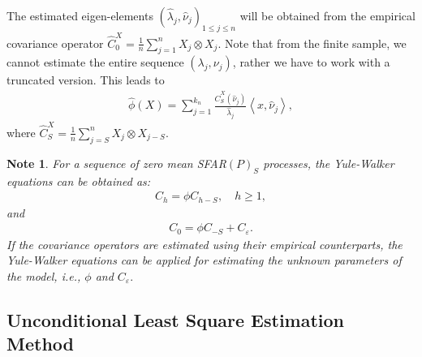 \documentclass[11pt,a4paper]{article}
\newtheorem{Note}{Note}[section]
\numberwithin{equation}{section}
\begin{document}
The estimated eigen-elements $(\hat{\lambda}_{j},\hat{\nu}_{j})_{1\leqslant j\leqslant n}$ will be obtained from the  empirical covariance operator $\hat{C}_0^X=\frac{1}{n}\sum_{j=1}^{n}X_{j}\otimes X_{j}$. Note that from the finite sample, we cannot estimate the entire sequence $\left({\lambda}_{j},{\nu}_{j}\right)$, rather we have to work with a truncated version. This leads to
\begin{align}
  \hat{\phi}(X)=\sum_{j=1}^{k_{n}}\frac{\hat{C}_S^X\left(\hat{\nu}_{j}\right)}{\hat{\lambda}_{j}} \left\langle{x},\hat{\nu}_{j}\right\rangle,
\end{align}
where $\hat{C}_S^X=\frac{1}{n}\sum_{j=S}^{n}X_{j}\otimes X_{j-S}$.
\begin{Note}
  For a sequence of zero mean SFAR$(P)_S$ processes, the Yule-Walker equations can be obtained as:
  \begin{align}
    C_h=\phi C_{h-S}, \quad h\geq 1,
  \end{align}
  and
  \begin{align}
    C_0=\phi C_{-S}+C_{\varepsilon}.
  \end{align}
  If the covariance operators are estimated using their empirical counterparts, the Yule-Walker equations can be applied for estimating the unknown parameters of the model, i.e., $\phi$ and $C_{\varepsilon}.$
\end{Note}


\subsection{Unconditional Least Square Estimation Method}
\end{document}
